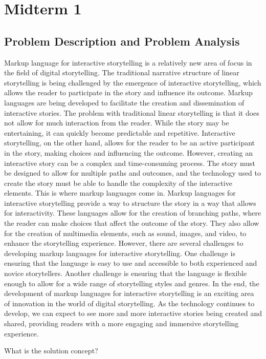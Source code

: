 \chapter{Midterm 1}
\section{Problem Description and Problem Analysis}
Markup language for interactive storytelling is a relatively new area of focus in the field of digital storytelling. The traditional narrative structure of linear storytelling is being challenged by the emergence of interactive storytelling, which allows the reader to participate in the story and influence its outcome. Markup languages are being developed to facilitate the creation and dissemination of interactive stories.
The problem with traditional linear storytelling is that it does not allow for much interaction from the reader. While the story may be entertaining, it can quickly become predictable and repetitive. Interactive storytelling, on the other hand, allows for the reader to be an active participant in the story, making choices and influencing the outcome.
 However, creating an interactive story can be a complex and time-consuming process. The story must be designed to allow for multiple paths and outcomes, and the technology used to create the story must be able to handle the complexity of the interactive elements. This is where markup languages come in.
Markup languages for interactive storytelling provide a way to structure the story in a way that allows for interactivity. These languages allow for the creation of branching paths, where the reader can make choices that affect the outcome of the story. They also allow for the creation of multimedia elements, such as sound, images, and video, to enhance the storytelling experience.
However, there are several challenges to developing markup languages for interactive storytelling. One challenge is ensuring that the language is easy to use and accessible to both experienced and novice storytellers. Another challenge is ensuring that the language is flexible enough to allow for a wide range of storytelling styles and genres.
In the end, the development of markup languages for interactive storytelling is an exciting area of innovation in the world of digital storytelling. As the technology continues to develop, we can expect to see more and more interactive stories being created and shared, providing readers with a more engaging and immersive storytelling experience.

What is the solution concept?

